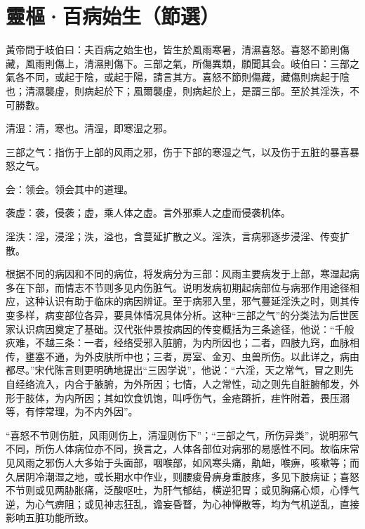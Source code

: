 \documentclass[draft,12pt]{ctexbook}
\begin{document}

\section{靈樞·百病始生（節選）}%


\begin{yuanwen}
黃帝問于岐伯曰：夫百病之始生也，皆生於風雨寒暑，清濕喜怒。喜怒不節則傷藏，風雨則傷上，清濕則傷下。三部之氣，所傷異類，願聞其会。岐伯曰：三部之氣各不同，或起于陰，或起于陽，請言其方。喜怒不節則傷藏，藏傷則病起于陰也；清濕襲虛，則病起於下；風爾襲虛，則病起於上，是謂三部。至於其淫泆，不可勝數。
\end{yuanwen}


\begin{jiaozhu}
  \item 清湿：清，寒也。清湿，即寒湿之邪。
  \item 三部之气：指伤于上部的风雨之邪，伤于下部的寒湿之气，以及伤于五脏的暴喜暴怒之气。
  \item 会：领会。领会其中的道理。
  \item 袭虚：袭，侵袭；虚，乘人体之虚。言外邪乘人之虚而侵袭机体。
  \item 淫泆：淫，浸淫；泆，溢也，含蔓延扩散之义。淫泆，言病邪逐步浸淫、传变扩散。
\end{jiaozhu}



根据不同的病因和不同的病位，将发病分为三部：风雨主要病发于上部，寒湿起病多在下部，而情志不节则多见内伤脏气。说明发病初期起病部位与病邪作用途径相应，这种认识有助于临床的病因辨证。至于病邪入里，邪气蔓延淫泆之时，则其传变多样，病变部位各异，要具体情况具体分析。这种“三部之气”的分类法为后世医家认识病因奠定了基础。汉代张仲景按病因的传变概括为三条途径，他说：“千般疢难，不越三条：一者，经络受邪入脏腑，为内所因也；二者，四肢九窍，血脉相传，壅塞不通，为外皮肤所中也；三者，房室、金刃、虫兽所伤。以此详之，病由都尽。”宋代陈言则更明确地提出“三因学说”，他说：“六淫，天之常气，冒之则先自经络流入，内合于腋腑，为外所因；七情，人之常性，动之则先自脏腑郁发，外形于肢体，为内所因；其如饮食饥饱，叫呼伤气，金疮蹐折，疰忤附着，畏压溺等，有悖常理，为不内外因”。


“喜怒不节则伤脏，风雨则伤上，清湿则伤下”；“三部之气，所伤异类”，说明邪气不同，所伤人体病位亦不同，换言之，人体各部位对病邪的易感性不同。故临床常见风雨之邪伤人大多始于头面部，咽喉部，如风寒头痛，鼽衄，喉痹，咳嗽等；而久居阴冷潮湿之地，或长期水中作业，则腰痠骨痹身重肢疼，多见下肢病证；喜怒不节则或见两胁胀痛，泛酸呕吐，为肝气郁结，横逆犯胃；或见胸痛心烦，心悸气逆，为心气痹阻；或见神志狂乱，谵妄昏瞀，为心神惮散等，均为气机逆乱，直接影响五脏功能所致。
\end{document}
